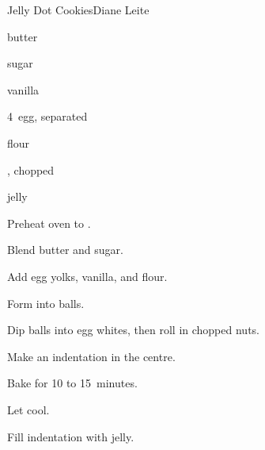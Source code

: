 \begin{recipe}{Jelly Dot Cookies}{Diane Leite}{}

\begin{ingredients}
\item {} butter
\item {} sugar
\item {} vanilla
\item 4~egg, separated
\item {} flour
\item {}, chopped
\item jelly
\end{ingredients}

\begin{directions}
\item Preheat oven to .
\item Blend butter and sugar.
\item Add egg yolks, vanilla, and flour.
\item Form into balls.
\item Dip balls into egg whites, then roll in chopped nuts.
\item Make an indentation in the centre.
\item Bake for 10 to 15~minutes.
\item Let cool.
\item Fill indentation with jelly.
\end{directions}

\end{recipe}
